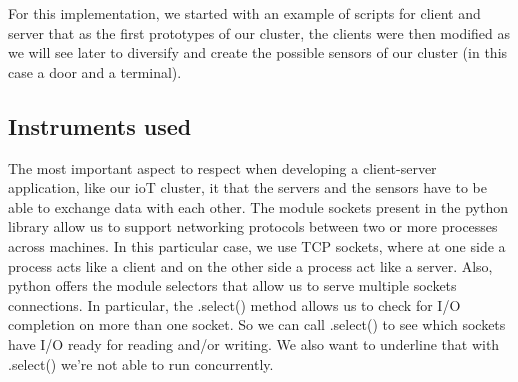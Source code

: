 For this implementation, we started with an example of scripts for client and server that as the first prototypes of our cluster, the clients were then modified as we will see later to diversify and create the possible sensors of our cluster (in this case a door and a terminal).
\\

\subsection{Instruments used}
The most important aspect
to respect when developing a client-server application, like our ioT cluster, it that the servers and the sensors have to be able to exchange data
with each other. The module sockets present in the python library allow us to support networking protocols between two or more processes across machines. In this particular case, we use TCP sockets, where at one side a process acts like a client and on the other side a process act like a server. Also, python offers the module selectors that allow us to serve multiple sockets connections. In particular, the .select() method allows us to check for I/O completion on more than one socket. So we can call .select() to see which sockets have I/O ready for reading and/or writing. We also want to underline that with .select() we’re not able to run concurrently.

